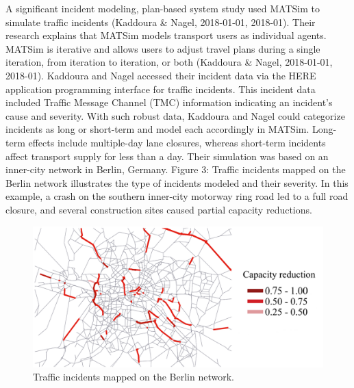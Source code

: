 \documentclass[fancy, oneside, mastersfancy, ms]{byuthesis}
\begin{document}
A significant incident modeling, plan-based system study used MATSim to
simulate traffic incidents (Kaddoura \& Nagel, 2018-01-01, 2018-01).
Their research explains that MATSim models transport users as individual
agents. MATSim is iterative and allows users to adjust travel plans
during a single iteration, from iteration to iteration, or both
(Kaddoura \& Nagel, 2018-01-01, 2018-01). Kaddoura and Nagel accessed
their incident data via the HERE application programming interface for
traffic incidents. This incident data included Traffic Message Channel
(TMC) information indicating an incident's cause and severity. With such
robust data, Kaddoura and Nagel could categorize incidents as long or
short-term and model each accordingly in MATSim. Long-term effects
include multiple-day lane closures, whereas short-term incidents affect
transport supply for less than a day. Their simulation was based on an
inner-city network in Berlin, Germany. Figure 3: Traffic incidents
mapped on the Berlin network illustrates the type of incidents modeled
and their severity. In this example, a crash on the southern inner-city
motorway ring road led to a full road closure, and several construction
sites caused partial capacity reductions.

\begin{figure}

{\centering \includegraphics{figures/berlin_capacity.png}

}

\caption{Traffic incidents mapped on the Berlin network.}

\end{figure}
\end{document}
